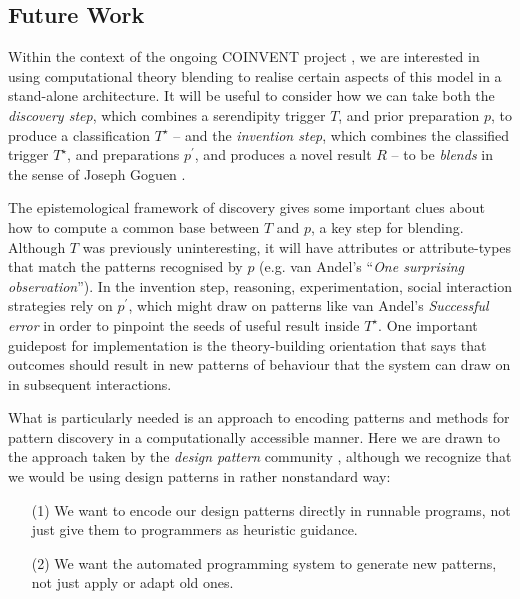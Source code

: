 \subsection{Future Work} \label{sec:futurework} \label{sec:hatching}

Within the context of the ongoing COINVENT project \cite{coinvent14},
we are interested in using computational theory blending to realise
certain aspects of this model in a stand-alone architecture.
%
It will be useful to consider how we can take both the \emph{discovery
  step}, which combines a serendipity trigger $T$, and prior
preparation $p$, to produce a classification $T^{\star}$ -- and the
\emph{invention step}, which combines the classified trigger
$T^{\star}$, and preparations $p^{\prime}$, and produces a novel
result $R$ -- to be \emph{blends} in the sense of Joseph Goguen
\citeyear{goguen1999introduction}.  

The epistemological framework of discovery gives some important clues
about how to compute a common base between $T$ and $p$, a key step for
blending.  Although $T$ was previously uninteresting, it will have
attributes or attribute-types that match the patterns recognised by
$p$ (e.g. van Andel's \citeyear{van1994anatomy} ``\emph{One surprising
  observation}'').
%
In the invention step, reasoning, experimentation, social interaction
strategies rely on $p^{\prime}$, which might draw on patterns like van
Andel's \emph{Successful error} in order to pinpoint the seeds of useful result
inside $T^{\star}$.  One important guidepost for implementation is
the theory-building orientation that says that outcomes should result in
new patterns of behaviour that the system can draw on in subsequent interactions.

What is particularly needed is an approach to encoding patterns and
methods for pattern discovery in a computationally accessible manner.
Here we are drawn to the approach taken by the \emph{design pattern}
community \cite{alexander1999origins}, although we recognize that we
would be using design patterns in rather nonstandard way:
\begin{itemize}
\item[(1)] We want to encode our design patterns directly in runnable
  programs, not just give them to programmers as heuristic guidance.
\item[(2)] We want the automated programming system to generate new
  patterns, not just apply or adapt old ones.
\end{itemize}

